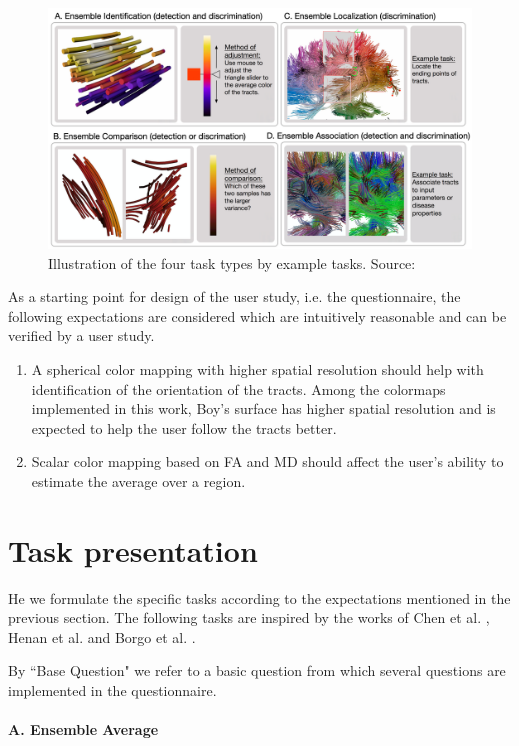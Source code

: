 \documentclass[hyperref, plainreport, noproblem]{cgvpub1}
\begin{document}
\begin{figure}[ht]
    \centering
    \includegraphics[width = 0.9\columnwidth]{task-types}
    \caption{Illustration of the four task types by example tasks. Source:  \cite{chen}}
    \label{fig:task-types}
\end{figure}

As a starting point for design of the user study, i.e. the questionnaire, the following expectations are considered which are intuitively reasonable and can be verified by a user study.
\begin{enumerate}
	\item A spherical color mapping with higher spatial resolution should help with identification of the orientation of the tracts. Among the colormaps implemented in this work, Boy's surface has higher spatial resolution and is expected to help the user follow the tracts better.
	\item Scalar color mapping based on FA and MD should affect the user's ability to estimate the average over a region.
\end{enumerate}

\section{Task presentation}
He we formulate the specific tasks according to the expectations mentioned in the previous section. The following tasks are inspired by the works of Chen et al. \cite{chen}, Henan et al. \cite{henan} and Borgo et al. \cite{borgo}.

By ``Base Question" we refer to a basic question from which several questions are implemented in the questionnaire.

\paragraph{A. Ensemble Average}
\end{document}

